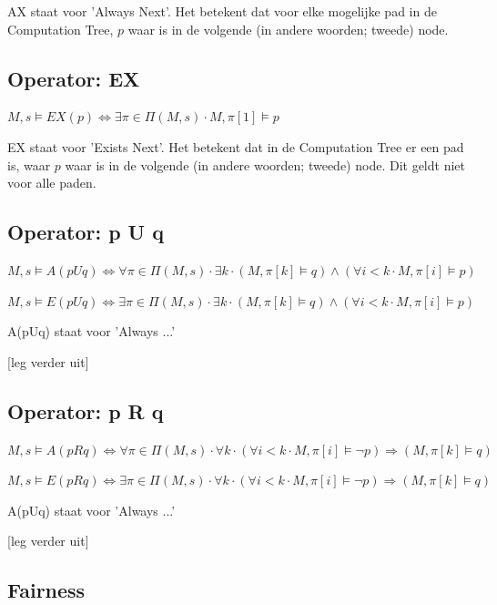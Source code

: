 \documentclass{article}
\begin{document}
		AX staat voor 'Always Next'. Het betekent dat voor elke mogelijke pad in de Computation Tree, \( p \) waar is in de volgende (in andere woorden; tweede) node. 
		
		\subsection{Operator: EX}
				
		\( M, s \models EX(p) \iff \exists \pi \in \Pi (M, s) \cdot M, \pi [1] \models p\)

		EX staat voor 'Exists Next'. Het betekent dat in de Computation Tree er een pad is, waar \( p \) waar is in de volgende (in andere woorden; tweede) node. Dit geldt niet voor alle paden.
		
		\subsection{Operator: p U q}
				
		\( M, s \models A(pUq) \iff \forall \pi \in \Pi (M, s) \cdot \exists k \cdot (M, \pi [k] \models q) \land (\forall i < k \cdot M, \pi[i] \models p)\)

		\( M, s \models E(pUq) \iff \exists \pi \in \Pi (M, s) \cdot \exists k \cdot (M, \pi [k] \models q) \land (\forall i < k \cdot M, \pi[i] \models p)\)

		A(pUq) staat voor 'Always ...' 

		[leg verder uit] 		

		\subsection{Operator: p R q}
				
		\( M, s \models A(pRq) \iff \forall \pi \in \Pi (M, s) \cdot \forall k \cdot (\forall i < k \cdot M, \pi [i] \models \neg p) \Rightarrow (M, \pi [k] \models q) \)

		\( M, s \models E(pRq) \iff \exists \pi \in \Pi (M, s) \cdot \forall k \cdot (\forall i < k \cdot M, \pi [i] \models \neg p) \Rightarrow (M, \pi [k] \models q) \)

		A(pUq) staat voor 'Always ...' 

		[leg verder uit] 		
		
		\subsection{Fairness}
				
\end{document}
